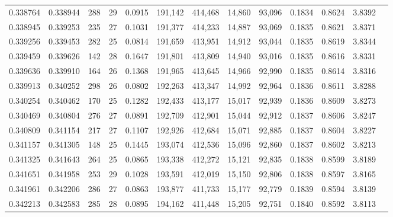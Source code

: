 \begin{tabular}{rrrrrrrrrrrrr}
0.338764 & 0.338944 &   288 &  29 &                                     0.0915 & 191,142 & 414,468 &  14,860 &  93,096 & 0.1834 & 0.8624 & 3.8392 \\
0.338945 & 0.339253 &   235 &  27 &                                     0.1031 & 191,377 & 414,233 &  14,887 &  93,069 & 0.1835 & 0.8621 & 3.8371 \\
0.339256 & 0.339453 &   282 &  25 &                                     0.0814 & 191,659 & 413,951 &  14,912 &  93,044 & 0.1835 & 0.8619 & 3.8344 \\
0.339459 & 0.339626 &   142 &  28 &                                     0.1647 & 191,801 & 413,809 &  14,940 &  93,016 & 0.1835 & 0.8616 & 3.8331 \\
0.339636 & 0.339910 &   164 &  26 &                                     0.1368 & 191,965 & 413,645 &  14,966 &  92,990 & 0.1835 & 0.8614 & 3.8316 \\
0.339913 & 0.340252 &   298 &  26 &                                     0.0802 & 192,263 & 413,347 &  14,992 &  92,964 & 0.1836 & 0.8611 & 3.8288 \\
0.340254 & 0.340462 &   170 &  25 &                                     0.1282 & 192,433 & 413,177 &  15,017 &  92,939 & 0.1836 & 0.8609 & 3.8273 \\
0.340469 & 0.340804 &   276 &  27 &                                     0.0891 & 192,709 & 412,901 &  15,044 &  92,912 & 0.1837 & 0.8606 & 3.8247 \\
0.340809 & 0.341154 &   217 &  27 &                                     0.1107 & 192,926 & 412,684 &  15,071 &  92,885 & 0.1837 & 0.8604 & 3.8227 \\
0.341157 & 0.341305 &   148 &  25 &                                     0.1445 & 193,074 & 412,536 &  15,096 &  92,860 & 0.1837 & 0.8602 & 3.8213 \\
0.341325 & 0.341643 &   264 &  25 &                                     0.0865 & 193,338 & 412,272 &  15,121 &  92,835 & 0.1838 & 0.8599 & 3.8189 \\
0.341651 & 0.341958 &   253 &  29 &                                     0.1028 & 193,591 & 412,019 &  15,150 &  92,806 & 0.1838 & 0.8597 & 3.8165 \\
0.341961 & 0.342206 &   286 &  27 &                                     0.0863 & 193,877 & 411,733 &  15,177 &  92,779 & 0.1839 & 0.8594 & 3.8139 \\
0.342213 & 0.342583 &   285 &  28 &                                     0.0895 & 194,162 & 411,448 &  15,205 &  92,751 & 0.1840 & 0.8592 & 3.8113 \\

\end{tabular}
